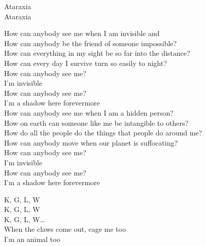 Ataraxia \\
Ataraxia \\




How can anybody see me when I am invisible and \\
How can anybody be the friend of someone impossible? \\
How can everything in my sight be so far into the distance? \\
How can every day I survive turn so easily to night? \\

How can anybody see me? \\
I'm invisible \\
How can anybody see me? \\
I'm a shadow here forevermore \\

How can anybody see me when I am a hidden person? \\
How on earth can someone like me be intangible to others? \\
How do all the people do the things that people do around me? \\
How can anybody move when our planet is suffocating? \\

How can anybody see me? \\
I'm invisible \\
How can anybody see me? \\
I'm a shadow here forevermore \\




K, G, L, W \\
K, G, L, W \\
K, G, L, W… \\

When the claws come out, cage me too \\
I'm an animal too \\
